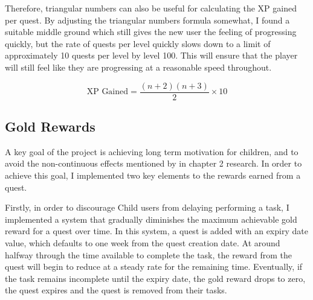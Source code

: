 Therefore, triangular numbers can also be useful for calculating the XP gained per quest. By adjusting the triangular numbers formula somewhat, I found a suitable middle ground which still gives the new user the feeling of progressing quickly, but the rate of quests per level quickly slows down to a limit of approximately 10 quests per level by level 100.
This will ensure that the player will still feel like they are progressing at a reasonable speed throughout.

\begin{equation} \label{eq:xpgainedtriangular}
	\textrm{XP Gained} = \frac{(n+2)(n+3)}{2} \times 10
\end{equation}

\begin{center}
\end{center}

\subsection{Gold Rewards}
A key goal of the project is achieving long term motivation for children, and to avoid the non-continuous effects mentioned by \cite{deci2001extrinsic} in chapter 2 research.
In order to achieve this goal, I implemented two key elements to the rewards earned from a quest.

Firstly, in order to discourage Child users from delaying performing a task, I implemented a system that gradually diminishes the maximum achievable gold reward for a quest over time. 
In this system, a quest is added with an expiry date value, which defaults to one week from the quest creation date.
At around halfway through the time available to complete the task, the reward from the quest will begin to reduce at a steady rate for the remaining time.
Eventually, if the task remains incomplete until the expiry date, the gold reward drops to zero, the quest expires and the quest is removed from their tasks.

